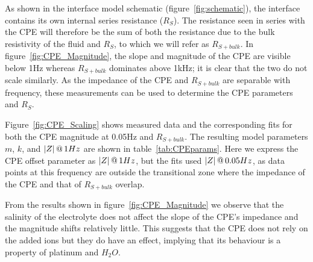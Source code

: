 \documentclass[journal, a4paper]{IEEEtran}
\begin{document}
{
As shown in the interface model schematic (figure~\ref{fig:schematic}), the interface contains its own internal series resistance ($R_{S}$). The resistance seen in series with the CPE will therefore be the sum of both the resistance due to the bulk resistivity of the fluid and $R_{S}$, to which we will refer as $R_{S+bulk}$.
In figure~\ref{fig:CPE_Magnitude}, the slope and magnitude of the CPE are visible below 1\thinspace Hz whereas $R_{S+bulk}$  dominates above 1\thinspace kHz; it is clear that the two do not scale similarly.
As the impedance of the CPE and $R_{S+bulk}$ are separable with frequency, these measurements can be used to determine the CPE parameters and $R_{S}$.

Figure~\ref{fig:CPE_Scaling} shows measured data and the corresponding fits for both the CPE magnitude at 0.05\thinspace Hz and $R_{S+bulk}$. The resulting model parameters $m$, $k$, and $|Z|\thinspace @\thinspace 1Hz$ are shown in table~\ref{tab:CPEparams}. Here we express the CPE offset parameter as $|Z|\thinspace @ \thinspace 1Hz$, but the fits used $|Z|\thinspace @ \thinspace 0.05Hz$, as data points at this frequency are outside the transitional zone where the impedance of the CPE and that of $R_{S+bulk}$ overlap.

From the results shown in figure~\ref{fig:CPE_Magnitude} we observe that the salinity of the electrolyte does not affect the slope of the CPE's impedance and the magnitude shifts relatively little. This suggests that the CPE does not rely on the added ions but they do have an effect, implying that its behaviour is a property of platinum and $H_{2}O$.

}
\end{document}
